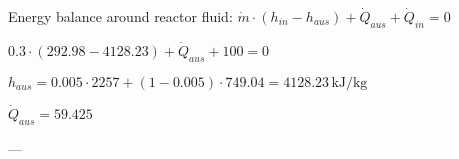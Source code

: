 Energy balance around reactor fluid:  
\( \dot{m} \cdot (h_{in} - h_{aus}) + \dot{Q}_{aus} + \dot{Q}_{in} = 0 \)  

\( 0.3 \cdot (292.98 - 4128.23) + \dot{Q}_{aus} + 100 = 0 \)  

\( h_{aus} = 0.005 \cdot 2257 + (1 - 0.005) \cdot 749.04 = 4128.23 \, \text{kJ/kg} \)  

\( \dot{Q}_{aus} = 59.425 \)  

---